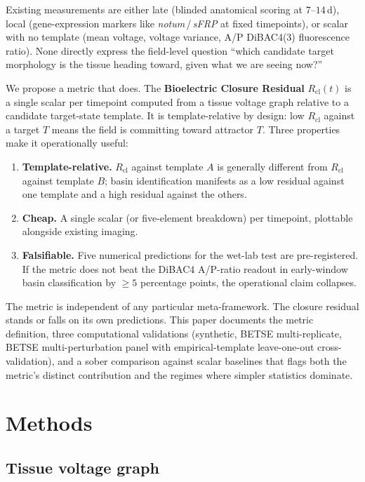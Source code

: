 \documentclass[11pt,a4paper]{article}
\begin{document}
Existing measurements are either late (blinded anatomical scoring at $7$--$14$\,d), local (gene-expression markers like \emph{notum}\,/\,\emph{sFRP} at fixed timepoints), or scalar with no template (mean voltage, voltage variance, A/P DiBAC4(3) fluorescence ratio). None directly express the field-level question ``which candidate target morphology is the tissue heading toward, given what we are seeing now?''

We propose a metric that does. The \textbf{Bioelectric Closure Residual} $R_{\mathrm{cl}}(t)$ is a single scalar per timepoint computed from a tissue voltage graph relative to a candidate target-state template. It is template-relative by design: low $R_{\mathrm{cl}}$ against a target $T$ means the field is committing toward attractor $T$. Three properties make it operationally useful:

\begin{enumerate}\itemsep0pt
\item \textbf{Template-relative.} $R_{\mathrm{cl}}$ against template $A$ is generally different from $R_{\mathrm{cl}}$ against template $B$; basin identification manifests as a low residual against one template and a high residual against the others.
\item \textbf{Cheap.} A single scalar (or five-element breakdown) per timepoint, plottable alongside existing imaging.
\item \textbf{Falsifiable.} Five numerical predictions for the wet-lab test are pre-registered. If the metric does not beat the DiBAC4 A/P-ratio readout in early-window basin classification by $\geq 5$ percentage points, the operational claim collapses.
\end{enumerate}

The metric is independent of any particular meta-framework. The closure residual stands or falls on its own predictions. This paper documents the metric definition, three computational validations (synthetic, BETSE multi-replicate, BETSE multi-perturbation panel with empirical-template leave-one-out cross-validation), and a sober comparison against scalar baselines that flags both the metric's distinct contribution and the regimes where simpler statistics dominate.

\section{Methods}\label{sec:methods}

\subsection{Tissue voltage graph}
\end{document}
